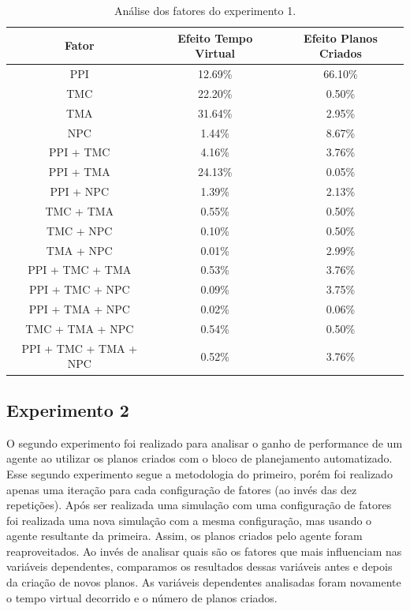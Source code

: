 \begin{table}
    \begin{center}
        \caption{Análise dos fatores do experimento 1.}
        \label{tab:experimento1fatores}
        \begin{tabular}{ |c|c|c| }
            \hline
            \textbf{Fator} & \textbf{Efeito Tempo Virtual} & \textbf{Efeito Planos Criados}\\  
            \hline
            PPI & 12.69\% & 66.10\%\\
            \hline
            TMC & 22.20\% & 0.50\%\\
            \hline
            TMA & 31.64\% & 2.95\%\\
            \hline
            NPC & 1.44\% & 8.67\%\\
            \hline
            PPI + TMC & 4.16\% & 3.76\%\\
            \hline
            PPI + TMA & 24.13\% & 0.05\%\\
            \hline
            PPI + NPC & 1.39\% & 2.13\%\\
            \hline
            TMC + TMA & 0.55\% & 0.50\%\\
            \hline
            TMC + NPC & 0.10\% & 0.50\%\\
            \hline
            TMA + NPC & 0.01\% & 2.99\%\\
            \hline
            PPI + TMC + TMA & 0.53\% & 3.76\%\\
            \hline
            PPI + TMC + NPC & 0.09\% & 3.75\%\\
            \hline
            PPI + TMA + NPC & 0.02\% & 0.06\%\\
            \hline
            TMC + TMA + NPC & 0.54\% & 0.50\%\\
            \hline
            PPI + TMC + TMA + NPC & 0.52\% & 3.76\%\\
            \hline
        \end{tabular}{}
    \end{center}{}
\end{table}

\subsection{Experimento 2}

O segundo experimento foi realizado para analisar o ganho de performance de um agente ao utilizar os planos criados com o bloco de planejamento automatizado. Esse segundo experimento segue a metodologia do primeiro, porém foi realizado apenas uma iteração para cada configuração de fatores (ao invés das dez repetições). Após ser realizada uma simulação com uma configuração de fatores foi realizada uma nova simulação com a mesma configuração, mas usando o agente resultante da primeira. Assim, os planos criados pelo agente foram reaproveitados. Ao invés de analisar quais são os fatores que mais influenciam nas variáveis dependentes, comparamos os resultados dessas variáveis antes e depois da criação de novos planos. As variáveis dependentes analisadas foram novamente o tempo virtual decorrido e o número de planos criados.

